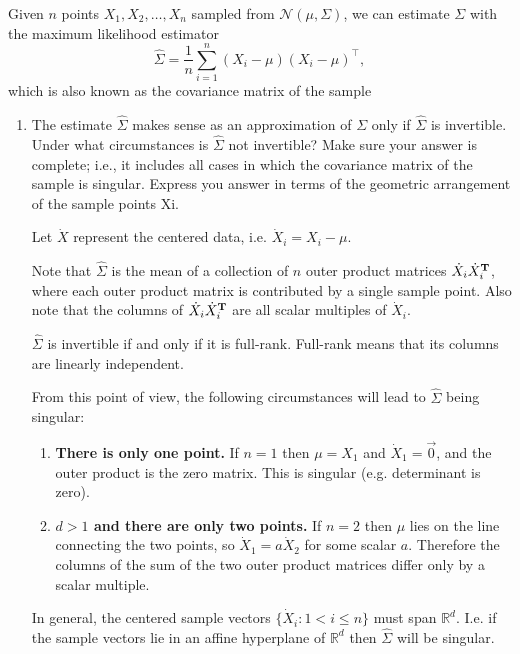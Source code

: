 \documentclass{article}
\renewcommand{\N}{\mathcal{N}}
\renewcommand{\R}{\mathbb{R}}
\renewcommand{\hat}{\widehat}
\begin{document}
\noindent
Given $n$ points $X_1, X_2, \ldots, X_n$ sampled from $\N(\mu, \Sigma)$, we can estimate $\Sigma$ with the maximum likelihood estimator
$$ \hat{\Sigma} = \frac{1}{n} \sum_{i=1}^n (X_i - \mu)(X_i - \mu)^{\top},$$ which is also known as the covariance matrix of the sample
\begin{enumerate}[label=(\alph*)]
\item The estimate $\hat{\Sigma}$ makes sense as an approximation of $\Sigma$
  only if $\hat{\Sigma}$ is invertible. Under what circumstances is
  $\hat{\Sigma}$ not invertible? Make sure your answer is complete; i.e., it
  includes all cases in which the covariance matrix of the sample is
  singular. Express you answer in terms of the geometric arrangement of the
  sample points Xi.
    \begin{mdframed}
      Let $\dot X$ represent the centered data, i.e. $\dot X_i = X_i - \mu$.

      Note that $\hat \Sigma$ is the mean of a collection of $n$ outer product
      matrices $\dot X_i \dot X_i^{\mathbf{T}}$, where each outer product matrix is
      contributed by a single sample point. Also note that the columns of
      $\dot X_i \dot X_i^{\mathbf{T}}$ are all scalar multiples of $\dot X_i$.

      $\hat \Sigma$ is invertible if and only if it is full-rank. Full-rank
      means that its columns are linearly independent.

      From this point of view, the following circumstances will lead to
      $\hat \Sigma$ being singular:

      \begin{enumerate}
      \item \textbf{There is only one point.} If $n = 1$ then $\mu = X_1$ and
        $\dot X_1 = \vec 0$, and the outer product is the zero matrix. This is
        singular (e.g. determinant is zero).
      \item \textbf{$d > 1$ and there are only two points.} If $n = 2$ then
        $\mu$ lies on the line connecting the two points, so
        $\dot X_1 = a\dot X_2$ for some scalar $a$. Therefore the columns of
        the sum of the two outer product matrices differ only by a scalar
        multiple.
      \end{enumerate}

      In general, the centered sample vectors $\{\dot X_i: 1 < i \leq n\}$ must
      span $\R^d$. I.e. if the sample vectors lie in an affine hyperplane of
      $\R^d$ then $\hat \Sigma$ will be singular.


\end{mdframed}
\end{enumerate}
\end{document}
